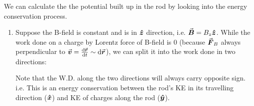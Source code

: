 \documentclass[class=article, crop=false, 12pt]{standalone}
\begin{document}
We can calculate the the potential built up in the rod
by looking into the energy conservation process.
\begin{enumerate}

    \item Suppose the B-field is constant and is in $\vu*{z}$ direction, i.e. $\va*{B}=B_z\vu*{z}$.
    While the work done on a charge by Lorentz force of B-field is $0$ 
    (because $\va*{F}_B$ always perpendicular to $\va*{v} =\dv{\va*{r}}{t} \sim \dd{\va*{r}}$),
    we can split it into the work done in two directions:

    Note that the W.D. along the two directions will always carry opposite sign.
    i.e. This is an energy conservation between the rod's KE in its travelling direction ($\vu*{x}$)
    and KE of charges along the rod ($\vu*{y}$).


\end{enumerate}
\end{document}
